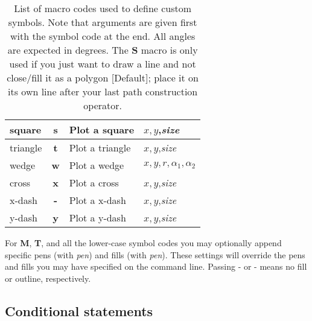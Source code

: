 \begin{table}[H]
\begin{tabular}{|l|c|l|l|}
square		&	\textbf{s}	& Plot a square 			& $x, y$,\emph{size}  \\ \hline
triangle	&	\textbf{t}	& Plot a triangle 			& $x, y$,\emph{size}  \\ \hline
wedge		&	\textbf{w}	& Plot a wedge 				& $x, y, r, \alpha_1, \alpha_2$  \\ \hline
cross		&	\textbf{x}	& Plot a cross 				& $x, y$,\emph{size}  \\ \hline
x-dash		&	\textbf{-}	& Plot a x-dash 			& $x, y$,\emph{size}  \\ \hline
y-dash		&	\textbf{y}	& Plot a y-dash 			& $x, y$,\emph{size}  \\ \hline
\end{tabular}
\label{tbl:custsymb}
\caption{List of macro codes used to define custom symbols.  Note that arguments are given first with the symbol code at the end.
All angles are expected in degrees. The \textbf{S} macro is only used if you just want to draw a line and not close/fill it as
a polygon [Default]; place it on its own line after your last path construction operator.}
\end{table} 
For \textbf{M}, \textbf{T}, and all the lower-case symbol codes you may optionally append specific pens (with \emph{pen})
and fills (with \emph{pen}).  These settings will override the pens and fills you may have specified
on the command line.  Passing - or - means no fill or outline, respectively.

\subsection{Conditional statements}

